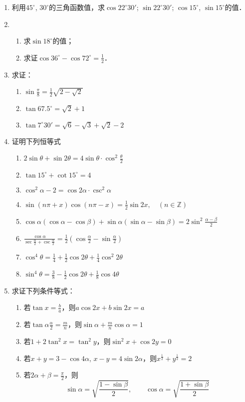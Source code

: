 \begin{enumerate}
\item 利用$45^{\circ}$, $30^{\circ}$的三角函数值，求$\cos22^{\circ}30'$; $\sin22^{\circ}30'$; $\cos15^{\circ}$, $\sin15^{\circ}$的值．
\item \begin{enumerate}
    \item 求$\sin18^{\circ}$的值；
    \item 求证$\cos36^{\circ}-\cos72^{\circ}=\frac{1}{2}$．
\end{enumerate}

\item 求证：
\begin{enumerate}
    \item $\sin\frac{\pi}{8}=\frac{1}{2}\sqrt{2-\sqrt{2}}$
    \item $\tan 67.5^{\circ}=\sqrt{2}+1$
    \item $\tan 7^{\circ}30'=\sqrt{6}-\sqrt{3}+\sqrt{2}-2$
\end{enumerate}
\item 证明下列恒等式
\begin{enumerate}
    \item $2\sin\theta+\sin2\theta=4\sin\theta\cdot \cos^2\frac{\theta}{2}$
    \item $\tan 15^{\circ}+\cot 15^{\circ}=4$
    \item $\cos^2\alpha-2=\cos2\alpha\cdot \csc^2\alpha$
    \item $\sin(n\pi+x)\cos(n\pi-x)=\frac{1}{2}\sin 2x,\quad (n\in \mathbb{Z})$
    \item $\cos\alpha(\cos\alpha-\cos\beta)+\sin\alpha(\sin\alpha-\sin\beta)=2\sin^2\frac{\alpha-\beta}{2}$
    \item $\frac{\cos\alpha}{\sec\frac{\alpha}{2}+\csc\frac{\alpha}{2}}=\frac{1}{2}\left(\cos\frac{\alpha}{2}-\sin\frac{\alpha}{2}\right)$
    \item $\cos^4\theta=\frac{1}{4}+\frac{1}{2}\cos2\theta+\frac{1}{4}\cos^2 2\theta$
    \item $\sin^4\theta=\frac{3}{8}-\frac{1}{2}\cos2\theta+\frac{1}{8}\cos4\theta$
\end{enumerate}

\item 求证下列条件等式：
\begin{enumerate}
    \item 若$\tan x=\frac{b}{a}$，则$a\cos 2x+b\sin 2x=a$
    \item 若$\tan\alpha\frac{\alpha}{2}=\frac{m}{n}$，则$\sin\alpha+\frac{m}{n}\cos\alpha=1$
    \item 若$1+2\tan^2 x=\tan^2 y$，则$\sin^2x+\cos 2y=0$
    \item 若$x+y=3-\cos4\alpha$, $x-y=4\sin2\alpha$，则$x^{\tfrac{1}{2}}+y^{\tfrac{1}{2}}=2$
    \item 若$2\alpha+\beta=\frac{\pi}{2}$，则
    \[\sin\alpha=\sqrt{\frac{1-\sin\beta}{2}},\qquad \cos\alpha=\sqrt{\frac{1+\sin\beta}{2}}\]
\end{enumerate}
\end{enumerate}

